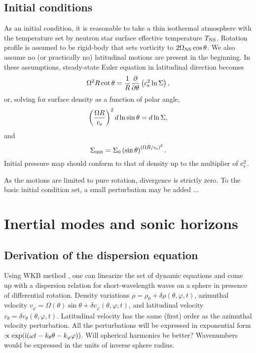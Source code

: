 \documentclass[usenatbib,onecolumn]{mnras}
\newcommand{\alert}[1]{\color{red} #1\color{black}}
\newcommand{\ppardir}[2]{\ensuremath{\frac{\partial }{\partial #1} \left( #2\right)}}
\newcommand{\cs}{\ensuremath{c_{\rm s}}}
\renewcommand{\i}{\ensuremath{{\rm i}}}
\begin{document}
\subsection{Initial conditions}

As an initial condition, it is reasonable to take a thin isothermal
atmosphere with the temperature set by neutron star surface effective temperature
$T_{\rm NS}$. Rotation profile is assumed to be rigid-body that sets vorticity
to $2\Omega_{\rm NS}\cos \theta$. We also assume no (or practically no)
latitudinal motions are present in the beginning.
In these assumptions, steady-state Euler equation in
latitudinal direction becomes
\begin{equation}\label{E:IC:Euler}
\Omega^2 R \cot \theta = \frac{1}{R} \ppardir{\theta}{\cs^2 \ln\Sigma},
\end{equation}
or, solving for surface density as a function of polar angle,
\begin{equation}
\left( \frac{\Omega R}{\cs}\right)^2 d\ln \sin\theta = d\ln \Sigma ,
\end{equation}
and
\begin{equation}\label{E:IC:Sigma}
\displaystyle \Sigma_{\rm init} = \Sigma_0 \left(\sin \theta \right)^{\left(\Omega R / \cs\right)^2}.
\end{equation}
Initial pressure map should conform to that of density up to the multiplier of
$\cs^2$.

As the motions are limited to pure rotation, divergence is strictly zero. To
the basic initial condition set, a small perturbation may be added ... 

\section{Inertial modes and sonic horizons}

\subsection{Derivation of the dispersion equation}

Using WKB method \citep{WKB}, one can linearize the set of dynamic equations
and come up with a dispersion relation for short-wavelength waves on a sphere
in presence of differential rotation. Density variations $\rho = \rho_0
+\delta \rho(\theta,\varphi, t)$, azimuthal velocity $v_\varphi = \Omega(\theta) \sin\theta +
\delta v_\varphi(\theta,\varphi, t)$, and latitudinal velocity $v_\theta = \delta
v_\theta(\theta,\varphi, t)$. Latitudinal velocity has the same (first) order
as the azimuthal velocity perturbation. All the perturbations will be
expressed in exponential form $\propto \exp(\i(\omega t - k_\theta \theta
- k_\varphi \varphi))$. \alert{Will spherical harmonics be better?}
Wavenumbers would be expressed in the units of inverse sphere radius. 
\end{document}

